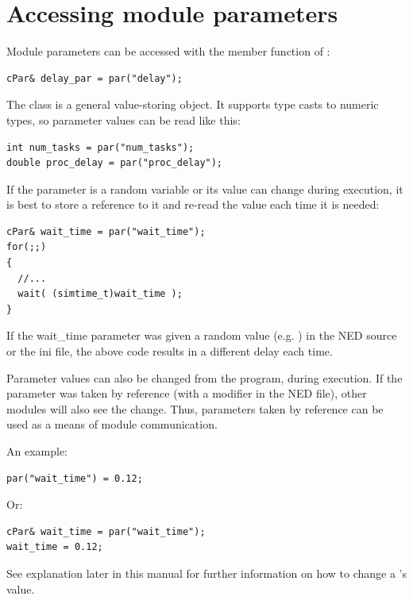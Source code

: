 \section{Accessing module parameters}
\label{ch:simple-modules:parameters}

Module parameters can be accessed
with the  member function of :

\begin{verbatim}
cPar& delay_par = par("delay");
\end{verbatim}

The  class is a general value-storing object. It supports
type casts to numeric types, so parameter values can be read
like this:

\begin{verbatim}
int num_tasks = par("num_tasks");
double proc_delay = par("proc_delay");
\end{verbatim}

If the parameter is a random variable or its value can change
during execution, it is best to store a reference to it and re-read
the value each time it is needed:

\begin{verbatim}
cPar& wait_time = par("wait_time");
for(;;)
{
  //...
  wait( (simtime_t)wait_time );
}
\end{verbatim}

If the wait\_time parameter was given a random value (e.g. )
in the NED source or the ini file, the above code results in
a different delay each time.

Parameter values can also be changed from the program, during
execution. If the parameter was taken by reference
 (with a
 modifier in the NED file), other modules
will also see the change.  Thus, parameters taken by reference can be
used as a means of module communication.


An example:

\begin{verbatim}
par("wait_time") = 0.12;
\end{verbatim}

Or:

\begin{verbatim}
cPar& wait_time = par("wait_time");
wait_time = 0.12;
\end{verbatim}


See  explanation later in this manual for further information
on how to change a 's value.


